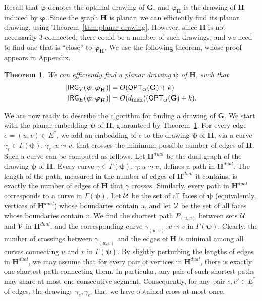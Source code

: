 \documentclass[twoside,leqno,twocolumn]{article}
\newcommand{\connect}{\leadsto}
\newtheorem{theorem}{Theorem}
\newcommand{\optcro}[1]{\mathsf{OPT}_{\mathsf{cr}}(#1)}
\newcommand{\irreg}{\mathsf{IRG}}
\newcommand{\dmax}{d_{\mbox{\textup{\footnotesize{max}}}}}
\newcommand{\G}{{\mathbf{G}}}
\renewcommand{\H}{{\mathbf{H}}}
\newcommand{\bphi}{{\boldsymbol{\varphi}}}
\newcommand{\bpsi}{{\boldsymbol{\psi}}}
\begin{document}
Recall that $\bphi$ denotes the optimal drawing of $\G$, and $\bphi_{\H}$ is the drawing of $\H$ induced by $\bphi$.
Since the graph $\H$ is planar, we can efficiently find its planar drawing, using Theorem~\ref{thm:planar drawing}. However, since $\H$ is not necessarily $3$-connected, there could be a number of such drawings, and we need to find one that is ``close'' to $\bphi_{\H}$. 
We use the following theorem, whose proof appears in Appendix.
\begin{theorem}\label{thm: good planar drawing}
We can efficiently find a planar drawing $\bpsi$ of $\H$, such that
\begin{align*}
|\irreg_V(\bpsi, \bphi_{\H})| &=  O(\optcro{\G} + k)\\
|\irreg_E(\bpsi, \bphi_{\H})| &= O(\dmax)(\optcro{\G} + k).
\end{align*}
\end{theorem}

We are now ready to describe the algorithm for finding a drawing of $\G$. We start with the planar embedding $\bpsi$ of $\H$, guaranteed by Theorem~\ref{thm: good planar drawing}.
For every edge $e=(u,v)\in E^*$, we add an embedding of $e$ to the drawing $\bpsi$ of $\H$, via a curve $\gamma_e\in \Gamma(\bpsi)$, $\gamma_e:u\connect v$, that crosses the minimum possible number of edges of $\H$. Such a curve can be computed as follows.
Let $\H^{dual}$ be the dual graph of the drawing $\bpsi$ of $\H$. 
Every curve  $\gamma\in \Gamma(\bpsi)$, $\gamma:u\connect v$,  
defines a path in $\H^{dual}$.
The length of the path, measured in the number of edges of $\H^{dual}$ it contains, is exactly the number of edges of $\H$ that $\gamma$ crosses.
Similarly, every path in $\H^{dual}$ corresponds to a curve in $\Gamma(\bpsi)$.
Let $\cal U$ be the set of all faces of $\bpsi$ (equivalently, vertices of $\H^{dual}$) whose boundaries contain $u$, and
let $\cal V$ be the set of all faces whose boundaries contain $v$. 
We find the shortest path $P_{(u,v)}$ between sets $\cal U$ and $\cal V$ in $\H^{dual}$,
and the corresponding curve $\gamma_{(u,v)}:u \connect v$ in $\Gamma(\bpsi)$.
Clearly, the number of crossings between $\gamma_{(u,v)}$ and the edges of $\H$ is 
minimal among all curves connecting $u$ and $v$ in $\Gamma(\bpsi)$. 
By slightly perturbing the lengths of edges in $\H^{dual}$, we may
assume that for every pair of vertices in $\H^{dual}$, there is exactly one shortest path connecting them. In particular, any pair of such shortest paths may share at most one consecutive segment.
Consequently, for any pair $e,e'\in E^*$ of edges, the drawings $\gamma_e,\gamma_{e'}$ that we have obtained cross at most once.
\end{document}
